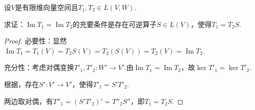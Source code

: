 \begin{problem}[5]\label{3.D.5}
    设\(V\)是有限维向量空间且\(T_1,T_2 \in L(V,W)\).

    求证：\(\operatorname{Im} T_1=\operatorname{Im} T_2\)的充要条件是存在可逆算子\(S \in L(V)\)，使得\(T_1=T_2S\).    
\end{problem}

\begin{proof}
    必要性：显然\(\operatorname{Im} T_1=T_1(V)=T_2S(V)=T_2(S(V))=T_2(V)=\operatorname{Im} T_2\).
    
    充分性：考虑对偶变换\(T'_1, T'_2: W' \rightarrow V'\).由\(\operatorname{Im} T_1=\operatorname{Im} T_2\)，故\(\ker T'_1=\ker T'_2\).

    根据，存在\(S': V' \rightarrow V'\)，使得\(T'_1=S'T'_2\).

    两边取对偶，有\(T''_1=(S'T'_2)'=T''_2S''\)，即\(T_1=T_2S\).
\end{proof}

